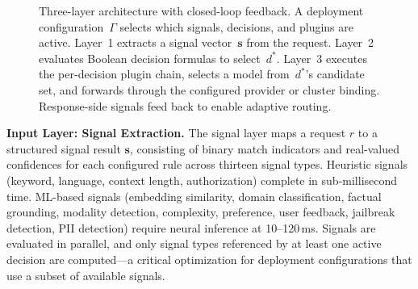 \begin{figure}[t]
{%
}
  \caption{Three-layer architecture with closed-loop feedback. A deployment configuration~$\Gamma$ selects which signals, decisions, and plugins are active. Layer~1 extracts a signal vector~$\mathbf{s}$ from the request. Layer~2 evaluates Boolean decision formulas to select~$d^*$. Layer~3 executes the per-decision plugin chain, selects a model from~$d^*$'s candidate set, and forwards through the configured provider or cluster binding. Response-side signals feed back to enable adaptive routing.}
  \label{fig:architecture}
\end{figure}

\noindent\textbf{Input Layer: Signal Extraction.}
The signal layer maps a request $r$ to a structured signal result $\mathbf{s}$, consisting of binary match indicators and real-valued confidences for each configured rule across thirteen signal types.
Heuristic signals (keyword, language, context length, authorization) complete in sub-millisecond time.
ML-based signals (embedding similarity, domain classification, factual grounding, modality detection, complexity, preference, user feedback, jailbreak detection, PII detection) require neural inference at 10--120\,ms.
Signals are evaluated in parallel, and only signal types referenced by at least one active decision are computed---a critical optimization for deployment configurations that use a subset of available signals.

